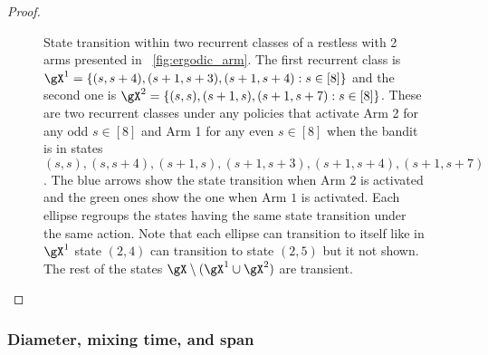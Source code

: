 \begin{proof}
\begin{figure}
        \caption{
            State transition within two recurrent classes of a restless with 2 arms presented in \figurename~\ref{fig:ergodic_arm}.
            The first recurrent class is $\gX^1 =\{(s,s+4),(s+1,s+3),(s+1,s+4): s\in[8]\}$ and the second one is $\gX^2 =\{(s,s),(s+1,s),(s+1,s+7): s\in[8]\}$.
            These are two recurrent classes under any policies that activate Arm 2 for any odd $s\in[8]$ and Arm 1 for any even $s\in[8]$ when the bandit is in states $(s,s),(s,s+4),(s+1,s),(s+1,s+3),(s+1,s+4),(s+1,s+7)$.
            The blue arrows show the state transition when Arm $2$ is activated and the green ones show the one when Arm $1$ is activated.
            Each ellipse regroups the states having the same state transition under the same action.
            Note that each ellipse can transition to itself like in $\gX^1$ state $(2,4)$ can transition to state $(2,5)$ but it not shown.
            The rest of the states $\gX\setminus(\gX^1\cup\gX^2)$ are transient.
        }
        \label{fig:local_ergodic_multichain_RB}
    \end{figure}
\end{proof}
\subsubsection{Diameter, mixing time, and span}

